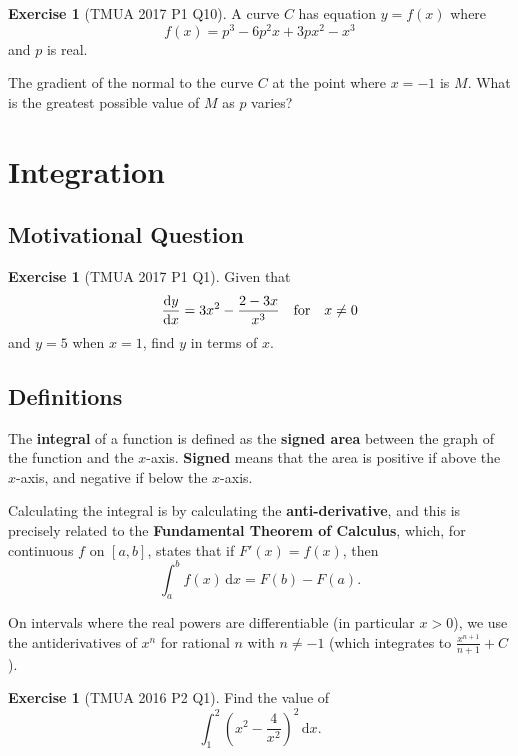 \documentclass[11pt]{article}
\theoremstyle{definition}
\newtheorem{example}[theorem]{Exercise}
\theoremstyle{remark}
\newcommand{\pqty}[1]{\left(#1\right)}
\newcommand{\qfor}{\quad\text{for}\quad}
\newcommand{\dd}[1]{\,\mathrm{d}#1}
\begin{document}
\begin{example}[TMUA 2017 P1 Q10]\label{tmua-4-unit-024}
    A curve \(C\) has equation \(y = f\pqty{x}\) where
    \[
        f\pqty{x} = p^3 - 6 p^2 x + 3 p x^2 - x^3
    \]
    and \(p\) is real.

    The gradient of the normal to the curve \(C\) at the point where \(x = -1\) is \(M\). What is the greatest possible value of \(M\) as \(p\) varies?
\end{example}

\section{Integration}\label{tmua-4-section-003}
\subsection{Motivational Question}\label{tmua-4-subsection-008}

\begin{example}[TMUA 2017 P1 Q1]\label{tmua-4-unit-025}
    Given that
    \[
        \dv{y}{x} = 3 x^2 - \frac{2 - 3x}{x^3} \qfor x \neq 0
    \]
    and \(y = 5\) when \(x = 1\), find \(y\) in terms of \(x\).
\end{example}

\subsection{Definitions}\label{tmua-4-subsection-009}

The \textbf{integral} of a function is defined as the \textbf{signed area} between the graph of the function and the \(x\)-axis. \textbf{Signed} means that the area is positive if above the \(x\)-axis, and negative if below the \(x\)-axis.

Calculating the integral is by calculating the \textbf{anti-derivative}, and this is precisely related to the \textbf{Fundamental Theorem of Calculus}, which, for continuous \(f\) on \([a,b]\), states that if \(F'\pqty{x} = f\pqty{x}\), then
\[
    \int_{a}^{b} f\pqty{x} \dd{x} = F\pqty{b} - F\pqty{a}.
\]

On intervals where the real powers are differentiable (in particular \(x>0\)), we use the antiderivatives of \(x^n\) for rational \(n\) with \(n \neq -1\) (which integrates to \(\frac{x^{n+1}}{n+1}+C\)).

\begin{example}[TMUA 2016 P2 Q1]\label{tmua-4-unit-026}
    Find the value of
    \[
        \int_{1}^{2} \pqty{x^2 - \frac{4}{x^2}}^2 \dd{x}.
    \]
\end{example}
\end{document}
